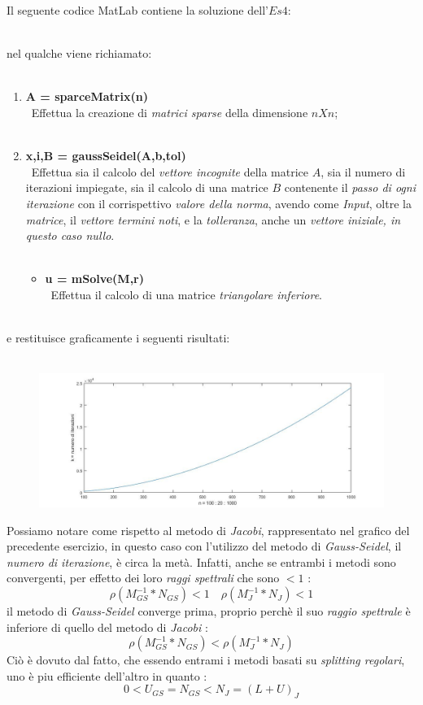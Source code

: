Il seguente codice MatLab contiene la soluzione dell'$Es 4$:\\\
	
nel qualche viene richiamato:\\\
	\begin{enumerate}
		\item \textbf{A = sparceMatrix(n)}\\\
			Effettua la creazione di \textit{matrici sparse} della dimensione $nXn$;\\\
		\item \textbf{x,i,B = gaussSeidel(A,b,tol)}\\\
			Effettua sia il calcolo del \textit{vettore incognite} della matrice $A$, sia il numero di iterazioni impiegate, sia il calcolo di una matrice $B$ contenente il \textit{passo di ogni iterazione} con il corrispettivo \textit{valore della norma}, avendo come \textit{Input}, oltre la 	\textit{matrice}, il \textit{vettore termini noti}, e la \textit{tolleranza}, anche un \textit{vettore iniziale, in questo caso nullo}.\\\
			
			\begin{itemize}
				\item \textbf{u = mSolve(M,r)}\\\
					Effettua il calcolo di una matrice \textit{triangolare inferiore}.\\\
					
			\end{itemize}
	\end{enumerate}
e restituisce graficamente i seguenti risultati:\\\
	\begin{figure}[H]
		\includegraphics[width=\textwidth]{Plot/Cap_6_Es_4}
	\end{figure}
Possiamo notare come rispetto al metodo di \textit{Jacobi}, rappresentato nel grafico del precedente esercizio, in questo caso con l'utilizzo del metodo di \textit{Gauss-Seidel}, il \textit{numero di iterazione}, è circa la metà. Infatti, anche se entrambi i metodi sono convergenti, per effetto dei loro \textit{raggi spettrali} che sono $<1$ :
	\[
		\rho(M^{-1}_{GS}*N_{GS})<1 \quad \rho(M^{-1}_{J}*N_{J})<1
	\]
il metodo di \textit{Gauss-Seidel} converge prima, proprio perchè il suo \textit{raggio spettrale} è inferiore di quello del metodo di \textit{Jacobi} :
	\[
		\rho(M^{-1}_{GS}*N_{GS})<\rho(M^{-1}_{J}*N_{J})
	\]
Ciò è dovuto dal fatto, che essendo entrami i metodi basati su \textit{splitting regolari}, uno è piu efficiente dell'altro in quanto :
	\[
		0<U_{GS}=N_{GS}<N_{J}=(L+U)_{J}
	\]
